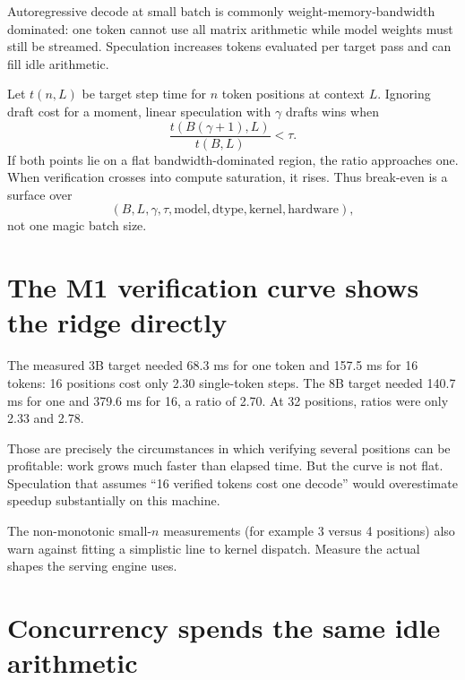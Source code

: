 Autoregressive decode at small batch is commonly weight-memory-bandwidth dominated:
one token cannot use all matrix arithmetic while model weights must still be streamed.
Speculation increases tokens evaluated per target pass and can fill idle arithmetic.

Let $t(n,L)$ be target step time for $n$ token positions at context $L$. Ignoring draft
cost for a moment, linear speculation with $\gamma$ drafts wins when
\begin{equation}
\frac{t(B(\gamma+1),L)}{t(B,L)} < \tau.
\label{eq:batch-break-even}
\end{equation}
If both points lie on a flat bandwidth-dominated region, the ratio approaches one.
When verification crosses into compute saturation, it rises. Thus break-even is a
surface over
\[
(B,L,\gamma,\tau,\text{model},\text{dtype},\text{kernel},\text{hardware}),
\]
not one magic batch size.


\section{The M1 verification curve shows the ridge directly}

The measured 3B target needed 68.3 ms for one token and 157.5 ms for 16 tokens:
16 positions cost only 2.30 single-token steps. The 8B target needed 140.7 ms for one
and 379.6 ms for 16, a ratio of 2.70. At 32 positions, ratios were only 2.33 and 2.78.

Those are precisely the circumstances in which verifying several positions can be
profitable: work grows much faster than elapsed time. But the curve is not flat.
Speculation that assumes ``16 verified tokens cost one decode'' would overestimate
speedup substantially on this machine.

The non-monotonic small-$n$ measurements (for example 3 versus 4 positions) also warn
against fitting a simplistic line to kernel dispatch. Measure the actual shapes the
serving engine uses.

\section{Concurrency spends the same idle arithmetic}

